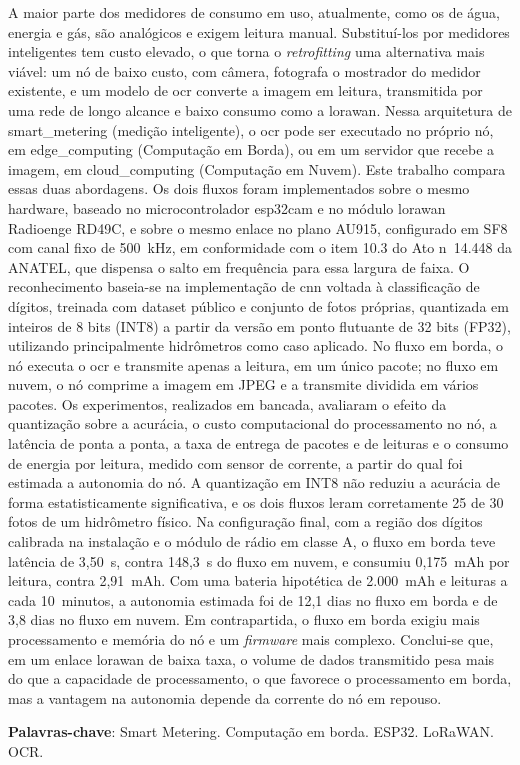 \begin{resumo}
A maior parte dos medidores de consumo em uso, atualmente, como os de água, energia e gás, são
analógicos e exigem leitura manual. Substituí-los por medidores inteligentes tem custo
elevado, o que torna o \textit{\gls{retrofitting}} uma alternativa mais viável: um nó de
baixo custo, com câmera, fotografa o mostrador do medidor existente, e um modelo de \gls{ocr}
converte a imagem em leitura, transmitida por uma rede de longo alcance e baixo consumo como
a \gls{lorawan}. Nessa arquitetura de \gls{smart_metering} (medição inteligente), o
\gls{ocr} pode ser executado no próprio nó, em \gls{edge_computing} (Computação em Borda), ou
em um servidor que recebe a imagem, em \gls{cloud_computing} (Computação em Nuvem). Este
trabalho compara essas duas abordagens. Os dois fluxos foram implementados sobre o mesmo
hardware, baseado no microcontrolador \gls{esp32cam} e no módulo \gls{lorawan} Radioenge
RD49C, e sobre o mesmo enlace no plano AU915, configurado em SF8 com canal fixo de
500~kHz, em conformidade com o item 10.3 do Ato n\textordmasculine~14.448 da ANATEL, que
dispensa o salto em frequência para essa largura de faixa. 
O reconhecimento baseia-se na implementação de \gls{cnn} voltada à classificação de dígitos,
treinada com dataset público e conjunto de fotos próprias, quantizada em inteiros de 8 bits (INT8)
a partir da versão em ponto flutuante de 32 bits (FP32), utilizando principalmente hidrômetros como caso aplicado.
No fluxo em borda, o nó executa o
\gls{ocr} e transmite apenas a leitura, em um único pacote; no fluxo em nuvem, o nó comprime
a imagem em JPEG e a transmite dividida em vários pacotes. 
Os experimentos, realizados em bancada, avaliaram o efeito da quantização sobre a
acurácia, o custo computacional do processamento no nó, a latência de ponta a ponta, a taxa
de entrega de pacotes e de leituras e o consumo de energia por leitura, medido com sensor de
corrente, a partir do qual foi estimada a autonomia do nó. A quantização em INT8 não
reduziu a acurácia de forma estatisticamente significativa, e os dois fluxos leram corretamente 25 de 30 fotos de um
hidrômetro físico. Na configuração final, com a região dos dígitos calibrada na instalação e
o módulo de rádio em classe A, o fluxo em borda teve latência de 3,50~s,
contra 148,3~s do fluxo em nuvem, e consumiu 0,175~mAh por leitura, contra 2,91~mAh. Com uma
bateria hipotética de 2.000~mAh e leituras a cada 10~minutos, a autonomia estimada foi de
12,1 dias no fluxo em borda e de 3,8 dias no fluxo em nuvem. Em contrapartida, o fluxo em
borda exigiu mais processamento e memória do nó e um \textit{firmware} mais complexo.
Conclui-se que, em um enlace \gls{lorawan} de baixa taxa, o volume de dados transmitido pesa
mais do que a capacidade de processamento, o que favorece o processamento em borda, mas a
vantagem na autonomia depende da corrente do nó em repouso.

\vspace{\onelineskip}

\noindent
\textbf{Palavras-chave}: Smart Metering. Computação em borda. ESP32. LoRaWAN. OCR.
\end{resumo}
